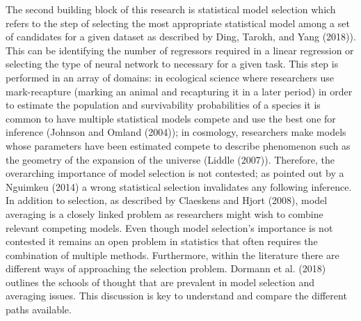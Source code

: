 \documentclass[]{article}
\begin{document}
The second building block of this research is statistical model
selection which refers to the step of selecting the most appropriate
statistical model among a set of candidates for a given dataset as
described by Ding, Tarokh, and Yang (2018)). This can be identifying the
number of regressors required in a linear regression or selecting the
type of neural network to necessary for a given task. This step is
performed in an array of domains: in ecological science where
researchers use mark-recapture (marking an animal and recapturing it in
a later period) in order to estimate the population and survivability
probabilities of a species it is common to have multiple statistical
models compete and use the best one for inference (Johnson and Omland
(2004)); in cosmology, researchers make models whose parameters have
been estimated compete to describe phenomenon such as the geometry of
the expansion of the universe (Liddle (2007)). Therefore, the
overarching importance of model selection is not contested; as pointed
out by a Nguimkeu (2014) a wrong statistical selection invalidates any
following inference. In addition to selection, as described by Claeskens
and Hjort (2008), model averaging is a closely linked problem as
researchers might wish to combine relevant competing models. Even though
model selection's importance is not contested it remains an open problem
in statistics that often requires the combination of multiple methods.
Furthermore, within the literature there are different ways of
approaching the selection problem. Dormann et al. (2018) outlines the
schools of thought that are prevalent in model selection and averaging
issues. This discussion is key to understand and compare the different
paths available.
\end{document}
